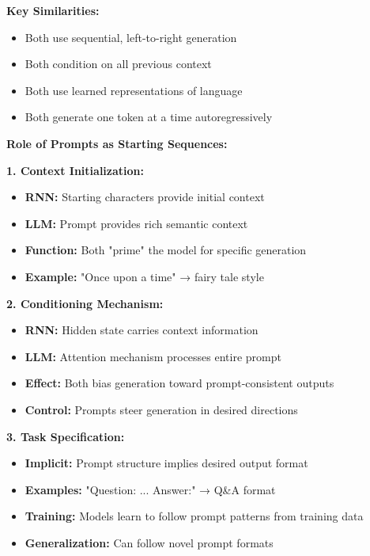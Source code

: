 \documentclass[12pt]{article}
\begin{document}
\begin{enumerate}[(a)]
{    \textbf{Key Similarities:}
    \begin{itemize}
        \item Both use sequential, left-to-right generation
        \item Both condition on all previous context
        \item Both use learned representations of language
        \item Both generate one token at a time autoregressively
    \end{itemize}
    
    \textbf{Role of Prompts as Starting Sequences:}
    
    \textbf{1. Context Initialization:}
    \begin{itemize}
        \item \textbf{RNN:} Starting characters provide initial context
        \item \textbf{LLM:} Prompt provides rich semantic context
        \item \textbf{Function:} Both "prime" the model for specific generation
        \item \textbf{Example:} "Once upon a time" → fairy tale style
    \end{itemize}
    
    \textbf{2. Conditioning Mechanism:}
    \begin{itemize}
        \item \textbf{RNN:} Hidden state carries context information
        \item \textbf{LLM:} Attention mechanism processes entire prompt
        \item \textbf{Effect:} Both bias generation toward prompt-consistent outputs
        \item \textbf{Control:} Prompts steer generation in desired directions
    \end{itemize}
    
    \textbf{3. Task Specification:}
    \begin{itemize}
        \item \textbf{Implicit:} Prompt structure implies desired output format
        \item \textbf{Examples:} "Question: ... Answer:" → Q\&A format
        \item \textbf{Training:} Models learn to follow prompt patterns from training data
        \item \textbf{Generalization:} Can follow novel prompt formats
    \end{itemize}
    
}
\end{enumerate}
\end{document}
